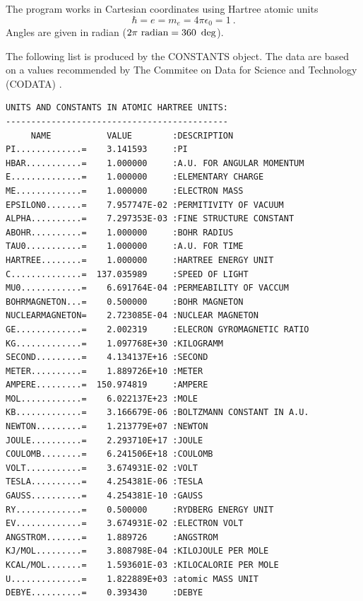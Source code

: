 \documentclass[final,12pt]{article}
\begin{document}
{{{The program works in Cartesian coordinates using Hartree atomic units
\begin{equation}
\hbar=e=m_e=4\pi\epsilon_0=1 \ .
\end{equation}
Angles are given in radian ($2\pi~{\rm radian}=360~\deg$).

The following list is produced by the CONSTANTS object.  The data are
based on a values recommended by The Commitee on Data for Science and
Technology (CODATA) \cite{mohr00_rmp72_351}.
\begin{verbatim}
UNITS AND CONSTANTS IN ATOMIC HARTREE UNITS:
--------------------------------------------
     NAME           VALUE        :DESCRIPTION
PI.............=    3.141593     :PI
HBAR...........=    1.000000     :A.U. FOR ANGULAR MOMENTUM
E..............=    1.000000     :ELEMENTARY CHARGE
ME.............=    1.000000     :ELECTRON MASS
EPSILON0.......=    7.957747E-02 :PERMITIVITY OF VACUUM
ALPHA..........=    7.297353E-03 :FINE STRUCTURE CONSTANT
ABOHR..........=    1.000000     :BOHR RADIUS
TAU0...........=    1.000000     :A.U. FOR TIME
HARTREE........=    1.000000     :HARTREE ENERGY UNIT
C..............=  137.035989     :SPEED OF LIGHT
MU0............=    6.691764E-04 :PERMEABILITY OF VACCUM
BOHRMAGNETON...=    0.500000     :BOHR MAGNETON
NUCLEARMAGNETON=    2.723085E-04 :NUCLEAR MAGNETON
GE.............=    2.002319     :ELECRON GYROMAGNETIC RATIO
KG.............=    1.097768E+30 :KILOGRAMM      
SECOND.........=    4.134137E+16 :SECOND     
METER..........=    1.889726E+10 :METER
AMPERE.........=  150.974819     :AMPERE           
MOL............=    6.022137E+23 :MOLE
KB.............=    3.166679E-06 :BOLTZMANN CONSTANT IN A.U.
NEWTON.........=    1.213779E+07 :NEWTON
JOULE..........=    2.293710E+17 :JOULE
COULOMB........=    6.241506E+18 :COULOMB
VOLT...........=    3.674931E-02 :VOLT
TESLA..........=    4.254381E-06 :TESLA
GAUSS..........=    4.254381E-10 :GAUSS
RY.............=    0.500000     :RYDBERG ENERGY UNIT
EV.............=    3.674931E-02 :ELECTRON VOLT
ANGSTROM.......=    1.889726     :ANGSTROM
KJ/MOL.........=    3.808798E-04 :KILOJOULE PER MOLE
KCAL/MOL.......=    1.593601E-03 :KILOCALORIE PER MOLE
U..............=    1.822889E+03 :atomic MASS UNIT 
DEBYE..........=    0.393430     :DEBYE



\end{verbatim}}}}
\end{document}
